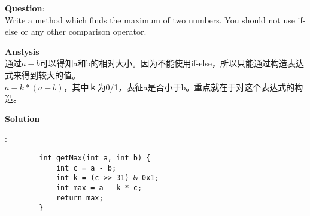     
\begin{description}
    \item{\textbf{Question}}:\\%
		Write a method which finds the maximum of two numbers. You should not use if-else or any other comparison operator.

    \item{\textbf{Anslysis}}\\
		通过$a-b$可以得知a和b的相对大小。因为不能使用if-else，所以只能通过构造表达式来得到较大的值。\\
		$a - k * (a - b)$，其中ｋ为0/1，表征a是否小于b。重点就在于对这个表达式的构造。

    \item{\textbf{Solution}}
	\item{} : \\
		\begin{lstlisting}
		int getMax(int a, int b) {
			int c = a - b;
			int k = (c >> 31) & 0x1;
			int max = a - k * c;
			return max;
		}
		\end{lstlisting}

\end{description}

